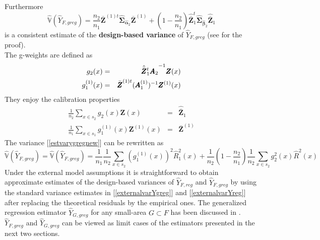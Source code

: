 \documentclass[a4paper,12pt,leqno, titlepage]{article}
\newcommand{\VAR}{\mathbb{V}}
\begin{document}
Furthermore
\begin{equation}\label{estvarygregnew}
\hat{\VAR}(\hat{Y}_{F,greg})=\frac{n_2}{n_1}\bar{\pmb{Z}}^{(1)t}\hat{\pmb{\Sigma}}_{\hat{\pmb{\alpha}}_2}
\bar{\pmb{Z}}^{(1)}+(1-\frac{n_2}{n_1})\hat{\bar{\pmb{Z}}}_1^t\hat{\pmb{\Sigma}}_{\hat{\pmb{\beta}}_2}
\hat{\bar{\pmb{Z}}}_1
\end{equation}
\noindent is a consistent estimate of the \textbf{design-based variance} of $\hat{Y}_{F,greg}$ (see \cite{mandallazreport2} for the proof).\\
The g-weights are defined as
\begin{eqnarray}\label{gweightygreg1}
g_2(x) &=& \hat{\bar{\pmb{Z}}}_1^t\pmb{A}_2}^{-1}{\pmb{Z}(x)\nonumber \\
g^{(1)}_1(x) &=& \bar{\pmb{Z}}^{(1)t}(\pmb{A}^{(1)}_1)^{-1}\pmb{Z}^{(1)}(x)
\end{eqnarray}
They enjoy the calibration properties
\begin{eqnarray}\label{gweightygreg2}
\frac{1}{n_2}\sum_{x\in{s}_2}g_2(x)\pmb{Z}(x)&=&\hat{\bar{\pmb{Z}}}_1 \nonumber \\
\frac{1}{n_1}\sum_{x\in{s}_1}g^{(1)}_1(x)\pmb{Z}^{(1)}(x)&=&\bar{\pmb{Z}}^{(1)}
\end{eqnarray}
The variance [\ref{estvarygregnew}] can be rewritten as
\begin{equation}\label{estvarygreggweights}
\hat{\VAR}(\hat{Y}_{F,greg})=\hat{\VAR}(\hat{Y}_{F,greg})=\frac{1}{n_1}\frac{1}{n_2}\sum_{x\in{s}_2}(g_1^{(1)}(x))^2\hat{R}_1^2(x)+
\frac{1}{n_2}(1-\frac{n_2}{n_1})\frac{1}{n_2}\sum_{x\in{s}_2}g_2^2(x)\hat{R}^2(x)
\end{equation}
Under the external model assumptions it is straightforward to obtain approximate estimates of the design-based variances of $\hat{Y}_{F,reg}$ and $\hat{Y}_{F,greg}$ by using the standard variance estimates in [\ref{externalvarYgreg}] and [\ref{externalvarYreg}] after replacing the theoretical residuals by the empirical ones.
The generalized regression estimator $\hat{Y}_{G,greg}$ for any small-area $G\subset F$ has been discussed in \cite{mandallazreport2, mandallaz4}. $\hat{Y}_{F,greg}$ and $\hat{Y}_{G,greg}$ can be viewed as limit cases of the estimators presented in the next two sections.
\end{document}
